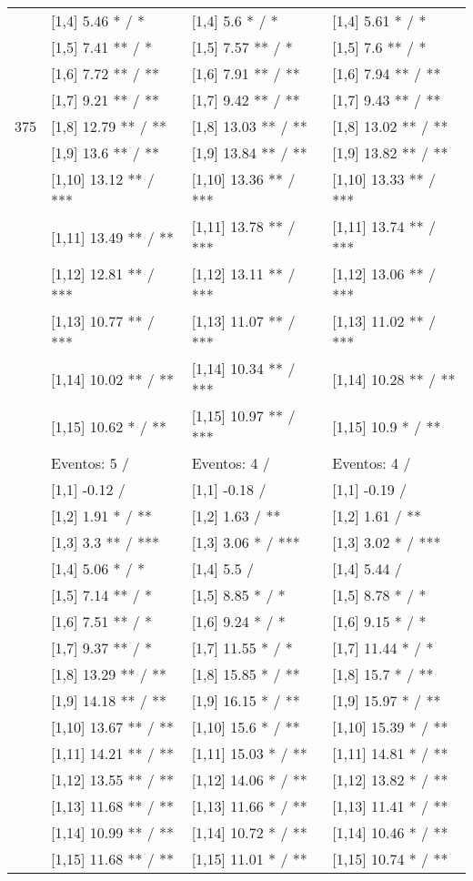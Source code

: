 \begin{table}
\begin{tabular}[t]{llll}
\addlinespace
 & {}[1,4] 5.46 * / * & {}[1,4] 5.6 * / * & {}[1,4] 5.61 * / *\\
 & {}[1,5] 7.41 ** / * & {}[1,5] 7.57 ** / * & {}[1,5] 7.6 ** / *\\
 & {}[1,6] 7.72 ** / ** & {}[1,6] 7.91 ** / ** & {}[1,6] 7.94 ** / **\\
 & {}[1,7] 9.21 ** / ** & {}[1,7] 9.42 ** / ** & {}[1,7] 9.43 ** / **\\
375 & {}[1,8] 12.79 ** / ** & {}[1,8] 13.03 ** / ** & {}[1,8] 13.02 ** / **\\
\addlinespace
 & {}[1,9] 13.6 ** / ** & {}[1,9] 13.84 ** / ** & {}[1,9] 13.82 ** / **\\
 & {}[1,10] 13.12 ** / *** & {}[1,10] 13.36 ** / *** & {}[1,10] 13.33 ** / ***\\
 & {}[1,11] 13.49 ** / ** & {}[1,11] 13.78 ** / *** & {}[1,11] 13.74 ** / ***\\
 & {}[1,12] 12.81 ** / *** & {}[1,12] 13.11 ** / *** & {}[1,12] 13.06 ** / ***\\
 & {}[1,13] 10.77 ** / *** & {}[1,13] 11.07 ** / *** & {}[1,13] 11.02 ** / ***\\
\addlinespace
 & {}[1,14] 10.02 ** / ** & {}[1,14] 10.34 ** / *** & {}[1,14] 10.28 ** / **\\
 & {}[1,15] 10.62 * / ** & {}[1,15] 10.97 ** / *** & {}[1,15] 10.9 * / **\\
 & Eventos:  5 / & Eventos:  4 / & Eventos:  4 /\\
 & {}[1,1] -0.12  / & {}[1,1] -0.18  / & {}[1,1] -0.19  /\\
 & {}[1,2] 1.91 * / ** & {}[1,2] 1.63  / ** & {}[1,2] 1.61  / **\\
\addlinespace
 & {}[1,3] 3.3 ** / *** & {}[1,3] 3.06 * / *** & {}[1,3] 3.02 * / ***\\
 & {}[1,4] 5.06 * / * & {}[1,4] 5.5  / & {}[1,4] 5.44  /\\
 & {}[1,5] 7.14 ** / * & {}[1,5] 8.85 * / * & {}[1,5] 8.78 * / *\\
 & {}[1,6] 7.51 ** / * & {}[1,6] 9.24 * / * & {}[1,6] 9.15 * / *\\
 & {}[1,7] 9.37 ** / * & {}[1,7] 11.55 * / * & {}[1,7] 11.44 * / *\\
\addlinespace
500 & {}[1,8] 13.29 ** / ** & {}[1,8] 15.85 * / ** & {}[1,8] 15.7 * / **\\
 & {}[1,9] 14.18 ** / ** & {}[1,9] 16.15 * / ** & {}[1,9] 15.97 * / **\\
 & {}[1,10] 13.67 ** / ** & {}[1,10] 15.6 * / ** & {}[1,10] 15.39 * / **\\
 & {}[1,11] 14.21 ** / ** & {}[1,11] 15.03 * / ** & {}[1,11] 14.81 * / **\\
 & {}[1,12] 13.55 ** / ** & {}[1,12] 14.06 * / ** & {}[1,12] 13.82 * / **\\
\addlinespace
 & {}[1,13] 11.68 ** / ** & {}[1,13] 11.66 * / ** & {}[1,13] 11.41 * / **\\
 & {}[1,14] 10.99 ** / ** & {}[1,14] 10.72 * / ** & {}[1,14] 10.46 * / **\\
 & {}[1,15] 11.68 ** / ** & {}[1,15] 11.01 * / ** & {}[1,15] 10.74 * / **\\
\bottomrule
\end{tabular}
\end{table}
